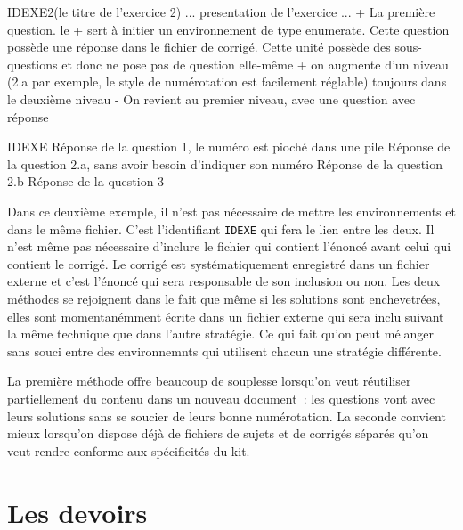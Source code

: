 \documentclass[11pt,report,oneside,solution]{cpgedev}
\let\ENV\env
\renewcommand\env[1]{{\spotcolor\ENV{#1}}}
\begin{document}
\begin{latex}[]
\begin{exercice}{IDEXE2}(le titre de l'exercice 2)
     ... presentation de l'exercice ...
\xques+ La première question. le + sert à initier un environnement de type enumerate. Cette question possède une réponse dans le fichier de corrigé.
\zques Cette unité possède des sous-questions et donc ne pose pas de question elle-même
     \xques+ on augmente d'un niveau (2.a par exemple, le style de numérotation est facilement réglable)
     \xques toujours dans le deuxième niveau
\xques- On revient au premier niveau, avec une question avec réponse 
\exit %
\end{exercice}

\begin{corrige}{IDEXE}
\xsol Réponse de la question 1, le numéro est pioché dans une pile 
\xsol Réponse de la question 2.a, sans avoir besoin d'indiquer son numéro 
\xsol Réponse de la question  2.b
\xsol Réponse de la question 3 
\end{corrige}
\end{latex} 
Dans ce deuxième exemple, il n'est pas nécessaire de mettre les environnements  et  dans le même fichier. C'est l'identifiant \verb+IDEXE+ qui fera le lien entre les deux. Il n'est même pas nécessaire d'inclure le fichier qui contient l'énoncé avant celui qui contient le corrigé. Le corrigé est systématiquement enregistré dans un fichier externe et c'est l'énoncé qui sera responsable de son inclusion ou non. Les deux méthodes se rejoignent dans le fait que même si les solutions sont enchevetrées, elles sont momentanémment écrite dans un fichier externe qui sera inclu suivant la même technique que dans l'autre stratégie. Ce qui fait qu'on peut mélanger sans souci entre des environnemnts qui utilisent chacun une stratégie différente.   

La première méthode offre beaucoup de souplesse lorsqu'on veut réutiliser partiellement du contenu dans un nouveau document~: les questions vont avec leurs solutions sans se soucier de leurs bonne numérotation. La seconde convient mieux lorsqu'on dispose déjà de fichiers de sujets et de corrigés séparés qu'on veut rendre conforme aux spécificités du kit. 



\section{Les devoirs}
\end{document}

